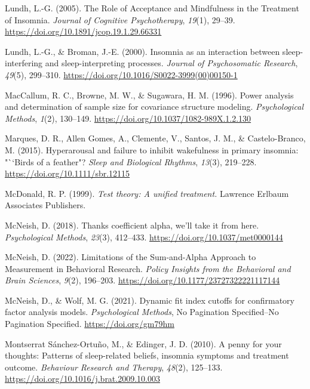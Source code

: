 \documentclass[
  ,doc,11pt, twoside,floatsintext]{apa6}
\newlength{\cslhangindent}
\newlength{\cslentryspacingunit} %
\newenvironment{CSLReferences}[2] %
 {%
  \setlength{\parindent}{0pt}
  \ifodd #1
  \let\oldpar\par
  \def\par{\hangindent=\cslhangindent\oldpar}
  \fi
  \setlength{\parskip}{#2\cslentryspacingunit}
 }%
 {}
\begin{document}
\begin{CSLReferences}{1}{0}
\leavevmode{}%
Lundh, L.-G. (2005). The {Role} of {Acceptance} and {Mindfulness} in the {Treatment} of {Insomnia}. \emph{Journal of Cognitive Psychotherapy}, \emph{19}(1), 29--39. \url{https://doi.org/10.1891/jcop.19.1.29.66331}

\leavevmode{}%
Lundh, L.-G., \& Broman, J.-E. (2000). Insomnia as an interaction between sleep-interfering and sleep-interpreting processes. \emph{Journal of Psychosomatic Research}, \emph{49}(5), 299--310. \url{https://doi.org/10.1016/S0022-3999(00)00150-1}

\leavevmode{}%
MacCallum, R. C., Browne, M. W., \& Sugawara, H. M. (1996). Power analysis and determination of sample size for covariance structure modeling. \emph{Psychological Methods}, \emph{1}(2), 130--149. \url{https://doi.org/10.1037/1082-989X.1.2.130}

\leavevmode{}%
Marques, D. R., Allen Gomes, A., Clemente, V., Santos, J. M., \& Castelo-Branco, M. (2015). Hyperarousal and failure to inhibit wakefulness in primary insomnia: "``Birds of a feather"? \emph{Sleep and Biological Rhythms}, \emph{13}(3), 219--228. \url{https://doi.org/10.1111/sbr.12115}

\leavevmode{}%
McDonald, R. P. (1999). \emph{Test theory: A unified treatment.} Lawrence Erlbaum Associates Publishers.

\leavevmode{}%
McNeish, D. (2018). Thanks coefficient alpha, we'll take it from here. \emph{Psychological Methods}, \emph{23}(3), 412--433. \url{https://doi.org/10.1037/met0000144}

\leavevmode{}%
McNeish, D. (2022). Limitations of the {Sum-and-Alpha Approach} to {Measurement} in {Behavioral Research}. \emph{Policy Insights from the Behavioral and Brain Sciences}, \emph{9}(2), 196--203. \url{https://doi.org/10.1177/23727322221117144}

\leavevmode{}%
McNeish, D., \& Wolf, M. G. (2021). Dynamic fit index cutoffs for confirmatory factor analysis models. \emph{Psychological Methods}, No Pagination Specified--No Pagination Specified. \url{https://doi.org/gm79hm}

\leavevmode{}%
Montserrat Sánchez-Ortuño, M., \& Edinger, J. D. (2010). A penny for your thoughts: {Patterns} of sleep-related beliefs, insomnia symptoms and treatment outcome. \emph{Behaviour Research and Therapy}, \emph{48}(2), 125--133. \url{https://doi.org/10.1016/j.brat.2009.10.003}


\end{CSLReferences}
\end{document}
